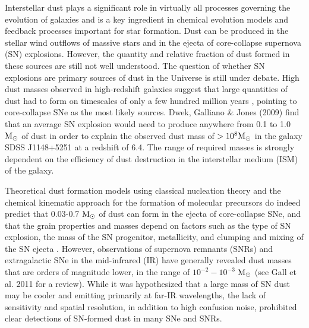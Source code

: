 \documentclass{emulateapj}
\begin{document}
Interstellar dust plays a significant role in virtually all processes governing the evolution of galaxies and is a key ingredient in chemical evolution models and feedback processes important for star formation. Dust can be produced in the stellar wind outflows of massive stars and in the ejecta of core-collapse supernova (SN) explosions. However, the quantity  and relative fraction of dust formed in these sources are still not well understood. 
The question of whether SN explosions are primary sources of dust in the Universe is still under debate. High dust masses observed in high-redshift galaxies suggest that large quantities of dust had to form on timescales of only a few hundred million years \citep[e.g.][]{gall11,valiente11,dwek11,dwek15b,michalowski15}, pointing to core-collapse SNe as the most likely sources.  Dwek, Galliano \& Jones (2009) find that an average SN explosion would need to produce anywhere from 0.1 to 1.0 $\rm M_{\odot}$ of dust in order to explain the observed dust mass of $> 10^8\rm M_{\odot}$ in the galaxy SDSS J1148+5251 at a redshift of 6.4. The range of required masses is strongly dependent on the efficiency of dust destruction in the interstellar medium (ISM) of the galaxy. 

Theoretical dust formation models using classical nucleation theory and the chemical kinematic approach for the formation of molecular precursors do indeed predict that 0.03-0.7 $\rm M_{\odot}$ of dust can form in the ejecta of core-collapse SNe, and that the grain properties and masses depend on factors such as the type of SN explosion, the mass of the SN progenitor, metallicity, and clumping and mixing of the SN ejecta \citep[e.g.][]{todini01,kozasa09,cherchneff09,cherchneff10, sarangi13, sarangi15}. However, observations of supernova remnants (SNRs) and extragalactic SNe in the mid-infrared (IR) have generally revealed dust masses that are orders of magnitude lower, in the range of $10^{-2}-10^{-3}$ $\rm M_{\odot}$ (see Gall et al. 2011 for a review). While it was hypothesized that a large mass of SN dust may be cooler and emitting primarily at far-IR wavelengths, the lack of sensitivity and spatial resolution, in addition to high confusion noise, prohibited clear detections of SN-formed dust in many SNe and SNRs.
\end{document}
